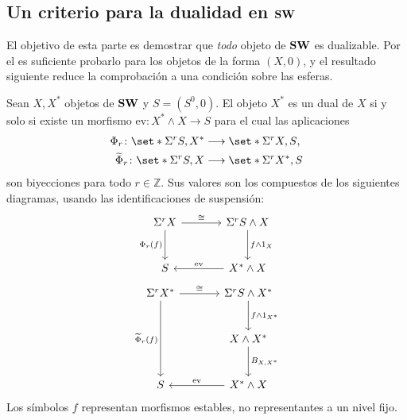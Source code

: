 \subsection{Un criterio para la dualidad en \texorpdfstring{$\mathbf{SW}$}{SW}}

El objetivo de esta parte es demostrar que \emph{todo} objeto de $\mathbf{SW}$ es dualizable. Por el  es suficiente probarlo para los objetos de la forma $(X,0)$, y el resultado siguiente reduce la comprobación a una condición sobre las esferas.

\begin{lema}\label{lema:criterio-dual}
Sean $X,X^*$ objetos de $\mathbf{SW}$ y $S=(S^0,0)$. El objeto $X^*$ es un dual de $X$ si y solo si existe un morfismo
$\mathrm{ev}\colon X^*\wedge X\to S$
para el cual las aplicaciones
\[
\begin{aligned}
\Phi_r\colon\set*{\Sigma^rS,X^*}&\longrightarrow\set*{\Sigma^rX,S},\\
\widetilde\Phi_r\colon\set*{\Sigma^rS,X}&\longrightarrow\set*{\Sigma^rX^*,S}
\end{aligned}
\]
son biyecciones para todo $r\in\mathbb Z$. Sus valores son los compuestos de los siguientes diagramas, usando las identificaciones de suspensión:
\[
\begin{tikzcd}[column sep=large,row sep=large]
\Sigma^rX \arrow[r,"{\cong}"] \arrow[d,"{\Phi_r(f)}"']
 &\Sigma^rS\wedge X \arrow[d,"{f\wedge1_X}"]\\
S &X^*\wedge X \arrow[l,"{\mathrm{ev}}"']
\end{tikzcd}
\]
\[
\begin{tikzcd}[column sep=large,row sep=large]
\Sigma^rX^* \arrow[r,"{\cong}"]
 \arrow[dd,"{\widetilde\Phi_r(f)}"']
 &\Sigma^rS\wedge X^* \arrow[d,"{f\wedge1_{X^*}}"]\\
 &X\wedge X^* \arrow[d,"{B_{X,X^*}}"]\\
S &X^*\wedge X \arrow[l,"{\mathrm{ev}}"']
\end{tikzcd}
\]
Los símbolos $f$ representan morfismos estables, no representantes a un nivel fijo.
\end{lema}

